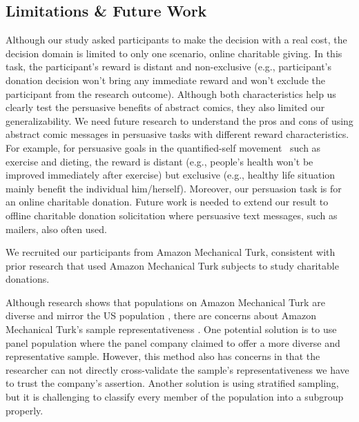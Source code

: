 \subsection{Limitations \& Future Work}
\begin{description}[leftmargin=\parindent,topsep=0pt,partopsep=3pt,parsep=0pt,itemsep=3pt, listparindent=\parindent]
\item[Distant and Non-exclusive Task:]  Although our study asked participants to make the decision with a real cost, the decision domain is limited to only one scenario, online charitable giving. In this task, the participant's reward is distant and non-exclusive (e.g., participant's donation decision won't bring any immediate reward and won't exclude the participant from the research outcome). Although both characteristics help us clearly test the persuasive benefits of abstract comics, they also limited our generalizability. We need future research to understand the pros and cons of using abstract comic messages in persuasive tasks with different reward characteristics. For example, for persuasive goals in the quantified-self movement~\cite{Epstein2014,Choe2014} such as exercise and dieting, the reward is distant (e.g., people's health won't be improved immediately after exercise) but exclusive (e.g., healthy life situation mainly benefit the individual him/herself). Moreover, our persuasion task is for an online charitable donation. Future work is needed to extend our result to offline charitable donation solicitation where persuasive text messages, such as mailers, also often used. 
\item[Study on Amazon Mechanical Turk:] We recruited our participants from Amazon Mechanical Turk, consistent with prior research \cite{lee2013does,saunders2016no,sussman2015framing,arechar2017turking,branas2018gender} that used Amazon Mechanical Turk subjects to study charitable donations. 


Although research shows that populations on Amazon Mechanical Turk are diverse and mirror the US population \cite{buhrmester2011amazon,behrend2011viability,berinsky2012evaluating}, there are concerns about Amazon Mechanical Turk's sample representativeness \cite{landers2015inconvenient,paolacci2010running}. One potential solution is to use panel population where the panel company claimed to offer a more diverse and representative sample.
However, this method also has concerns in that the researcher can not directly cross-validate the sample's representativeness we have to trust the company's assertion. Another solution is using stratified sampling, but it is challenging to classify every member of the population into a subgroup properly. 


\end{description}

